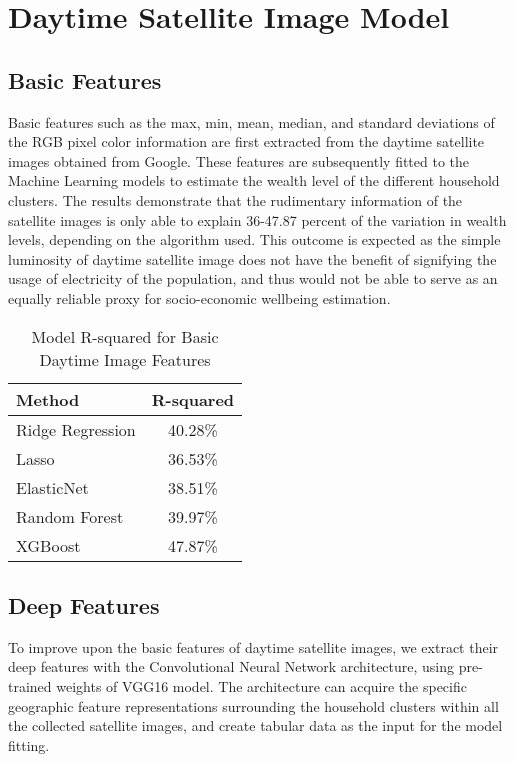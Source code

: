 \documentclass[solid,math,chem,code,plot,gloss]{bmc}
\begin{document}
\section{Daytime Satellite Image Model}

\subsection{Basic Features}

Basic features such as the max, min, mean, median, and standard deviations of the RGB pixel color information are first extracted from the daytime satellite images obtained from Google. These features are subsequently fitted to the Machine Learning models to estimate the wealth level of the different household clusters. The results demonstrate that the rudimentary information of the satellite images is only able to explain 36-47.87 percent of the variation in wealth levels, depending on the algorithm used. This outcome is expected as the simple luminosity of daytime satellite image does not have the benefit of signifying the usage of electricity of the population, and thus would not be able to serve as an equally reliable proxy for socio-economic wellbeing estimation. 

\begin{table}[hbt!]
\begin{center}
\begin{tabular}{|l|c|}
\hline
Method & R-squared \\
\hline\hline\hline
Ridge Regression & 40.28\% \\
Lasso & 36.53\% \\
ElasticNet & 38.51\% \\
Random Forest & 39.97\% \\
XGBoost & 47.87\% \\
\hline
\end{tabular}
\end{center}
\label{tab:RMSEs}
\caption{Model R-squared for Basic Daytime Image Features}
\end{table}

\subsection{Deep Features}

To improve upon the basic features of daytime satellite images, we extract their deep features with the Convolutional Neural Network architecture, using pre-trained weights of VGG16 model. The architecture can acquire the specific geographic feature representations surrounding the household clusters within all the collected satellite images, and create tabular data as the input for the model fitting.
\end{document}
